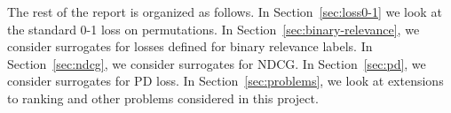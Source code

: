 
The rest of the report is organized as follows.
In Section~\ref{sec:loss0-1} we look at the standard 0-1 loss on permutations.
In Section~\ref{sec:binary-relevance}, we consider surrogates for losses
defined for binary relevance labels.
In Section~\ref{sec:ndcg}, we consider surrogates for NDCG.
In Section~\ref{sec:pd}, we consider surrogates for PD loss.
In Section~\ref{sec:problems}, we look at extensions to ranking and other
problems considered in this project.
